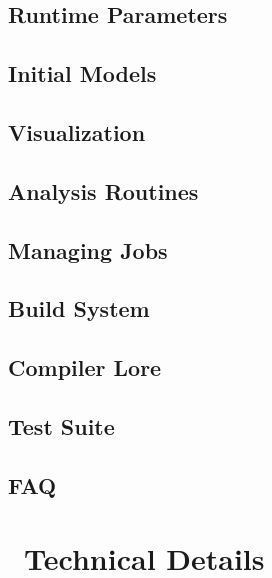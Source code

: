 \documentclass[11pt]{book}    %
\begin{document}
\chapter{Runtime Parameters}
\label{ch:runtimeparameters}



\chapter{Initial Models}


\chapter{Visualization}


\chapter{Analysis Routines}


\chapter{Managing Jobs}


\chapter{Build System}


\chapter{Compiler Lore}


\chapter{Test Suite}


\chapter{FAQ}


\part{\maestro\ Technical Details}
\end{document}
